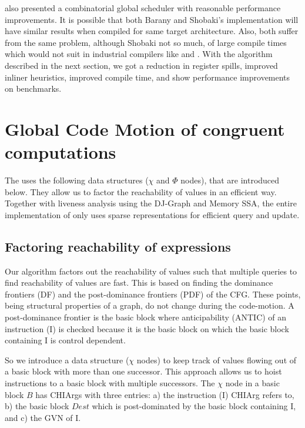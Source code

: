 \documentclass[sigplan,10pt,review,anonymous]{acmart}\settopmatter{printfolios=true,printccs=false,printacmref=false}
\begin{document}
\citet{shobaki2013} also presented a combinatorial global scheduler with
reasonable performance improvements. It is possible that both Barany and
Shobaki's implementation will have similar results when compiled for same target
architecture. Also, both suffer from the same problem, although Shobaki not so
much, of large compile times which would not suit in industrial compilers like
\GCC{} and \LLVM{}. With the algorithm described in the next section, we got a
reduction in register spills, improved inliner heuristics, improved compile
time, and show performance improvements on \SPEC{} benchmarks.

\section{Global Code Motion of congruent computations}
\label{sec:gcm}
The \GCM{} uses the following data structures ($\chi$ and $\Phi$ nodes), that
are introduced below. They allow us to factor the reachability of values in an
efficient way. Together with liveness analysis using the DJ-Graph \cite{das2012}
and Memory SSA, the entire implementation of \gcm{} only uses sparse
representations for efficient query and update.

\subsection{Factoring reachability of expressions}
\label{sec:chi}
Our algorithm factors out the reachability of values such that multiple queries
to find reachability of values are fast. This is based on finding the dominance
frontiers (DF) and the post-dominance frontiers (PDF) of the CFG. These points,
being structural properties of a graph, do not change during the code-motion. A
post-dominance frontier is the basic block where anticipability (ANTIC) of an
instruction (I) is checked because it is the basic block on which the basic
block containing I is control dependent.

So we introduce a data structure ($\chi$ nodes) to keep track of values flowing
out of a basic block with more than one successor. This approach allows us to
hoist instructions to a basic block with multiple successors. The $\chi$ node in
a basic block $B$ has CHIArgs with three entries: a) the instruction (I) CHIArg
refers to, b) the basic block $Dest$ which is post-dominated by the basic block
containing I, and c) the GVN of I.
\end{document}
